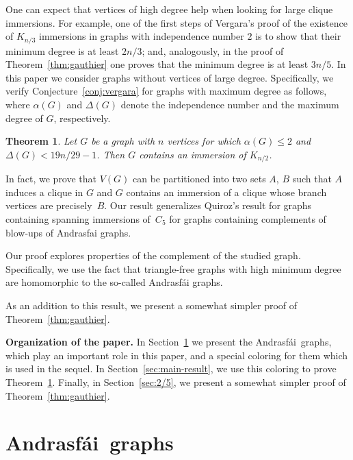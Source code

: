 \documentclass[a4paper,12pt]{article}
\newtheorem{theorem}{Theorem}
\newcommand{\andrasfai}{Andrasf\'ai}
\begin{document}
One can expect that vertices of high degree help when looking for large clique immersions.
For example, one of the first steps of Vergara's proof of the existence of \(K_{n/3}\) immersions
in graphs with independence number \(2\) is to show that their minimum degree is at least \(2n/3\);
and, analogously, in the proof of Theorem~\ref{thm:gauthier} one proves that the minimum degree is at least \(3n/5\). 
In this paper we consider graphs without vertices of large degree.
Specifically, we verify Conjecture~\ref{conj:vergara} for graphs with maximum degree as follows,
where \(\alpha(G)\) and \(\Delta(G)\) denote the independence number and the maximum degree of \(G\), 
respectively.

\begin{theorem}\label{thm:main}
Let \(G\) be a graph with \(n\) vertices for which \(\alpha(G) \leq 2\) 
and \(\Delta(G) < 19n/29 - 1\).
Then \(G\) contains an immersion of \(K_{n/2}\).
\end{theorem}

In fact, we prove that \(V(G)\) can be partitioned into two sets \(A\), \(B\)
such that \(A\) induces a clique in \(G\) and \(G\) contains an immersion of 
a clique whose branch vertices are precisely~\(B\).
Our result generalizes Quiroz's result for graphs containing spanning immersions 
of~\(C_5\) for graphs containing complements of blow-ups of Andrasfai graphs. 

Our proof explores properties of the complement of the studied graph.
Specifically, we use the fact that triangle-free graphs with 
high minimum degree are homomorphic to the so-called Andrasfái graphs.

As an addition to this result, we present a somewhat simpler proof of Theorem~\ref{thm:gauthier}.

\smallskip
\noindent
\textbf{Organization of the paper.}
In Section~\ref{sec:andrasfai} we present the \andrasfai~graphs,
which play an important role in this paper,
and a special coloring for them which is used in the sequel.
In Section~\ref{sec:main-result}, we use this coloring to prove Theorem~\ref{thm:main}.
Finally, in Section~\ref{sec:2/5}, we present a somewhat simpler proof of Theorem~\ref{thm:gauthier}.

\section{\andrasfai~graphs}\label{sec:andrasfai}
\end{document}
